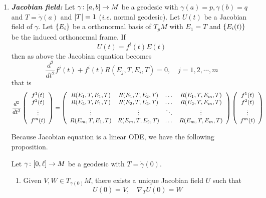 \begin{enumerate}[label=\arabic{*}.]
	\item \emph{\textbf{Jacobian field:}}	Let $\gamma \colon [a,b] \rightarrow M$ be a geodesic with $\gamma(a) = p, \gamma(b)=q$ and $T = \dot{\gamma}(a)$ and $\left\lvert T\right\lvert = 1$ (\emph{i.e.} normal geodesic). Let $U(t)$ be a Jacobian field of $\gamma$. Let $\left\{E_i\right\}$ be a orthonormal basis of $T_pM$ with $E_1 = T$ and $\left\{E_i(t)\right\}$ be the induced orthonormal frame. If
	\begin{equation*}
		U(t) = f^i(t)E(t)
	\end{equation*}
	then as above the Jacobian equation becomes
	\begin{equation*}
		\frac{d^2}{dt^2}f^j(t) + f^i(t)R(E_j,T,E_i,T) = 0,\quad j=1,2,\cdots,m
	\end{equation*}
	that is
	\begin{equation*}
		\frac{d^2}{dt^2}\left(
			\begin{array}{c}
				f^1(t) \\
				f^2(t) \\
				\vdots \\
				f^m(t)
			\end{array}
		\right) = \left(
			\begin{array}{cccc}
				R(E_1,T,E_1,T)&R(E_1,T,E_2,T)&\dots&R(E_1,T,E_m,T) \\
				R(E_2,T,E_1,T)&R(E_2,T,E_2,T)&\dots&R(E_2,T,E_m,T) \\
				\vdots & \vdots & \ddots &\vdots \\
				R(E_m,T,E_1,T)&R(E_m,T,E_2,T)&\dots&R(E_m,T,E_m,T)
			\end{array}
		\right)\left(
			\begin{array}{c}
				f^1(t) \\
				f^2(t) \\
				\vdots \\
				f^m(t)
			\end{array}
		\right)
	\end{equation*}

	Because Jacobian equation is a linear ODE, we have the following proposition.
	\begin{prop}
		Let $\gamma \colon [0,\ell] \rightarrow M$ be a geodesic with $T = \dot{\gamma}(0)$.
		\begin{enumerate}[label=(\arabic{*})]
			\item Given $V,W \in T_{\gamma(0)}M$, there exists a unique Jacobian field $U$ such that
			\begin{equation*}
				U(0) = V,\quad \nabla_TU(0) = W
			\end{equation*}


\end{enumerate}
\end{prop}
\end{enumerate}
